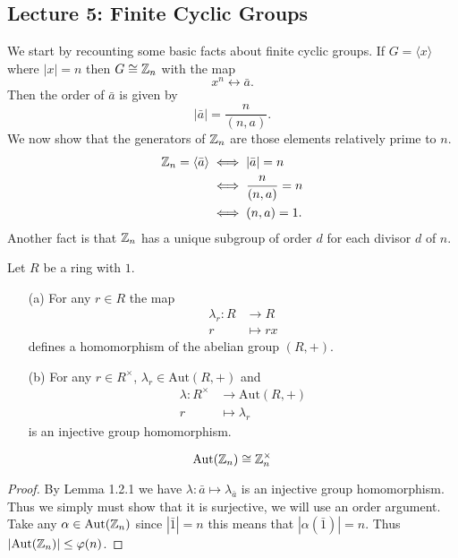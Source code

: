 \documentclass[11pt,leqno,oneside]{amsart}
\newcommand{\isom}{\mathrel{\cong}}
\newcommand{\Aut}{\text{Aut}}  %
\begin{document}
\subsection*{Lecture 5: Finite Cyclic Groups}
We start by recounting some basic facts about finite cyclic groups. If
\(G=\langle x\rangle\) where \(|x|=n\) then \(G \isom \Z_n\) with the map
\[x^n \longleftrightarrow \bar{a}.\] Then the order of \(\bar{a}\) is given by
\[|\bar{a}|=\frac{n}{(n,a)}.\] We now show that the generators of \({\mathbb Z}_n\) are
those elements relatively prime to \(n\).
\begin{align*}
  {\mathbb Z}_n = \langle \bar{a} \rangle &\iff |\bar{a}|=n\\
                                 &\iff \frac{n}{(n,a)}=n\\
                                 &\iff (n,a)=1.
\end{align*}
Another fact is that \({\mathbb Z}_n\) has a unique subgroup of order \(d\) for each
divisor \(d\) of \(n\).
\begin{lem*}[1.2.1] Let \(R\) be a ring with \(1\).
  \begin{enumerate}
  \item[(a)] For any \(r \in R\) the map
    \begin{align*}
      \lambda_r \colon R &\to R\\
      r &\mapsto rx
    \end{align*}
    defines a homomorphism of the abelian group \((R,+)\).
  \item[(b)] For any \(r \in R^\times\), \(\lambda_r \in \Aut(R,+)\) and
    \begin{align*}
      \lambda \colon R^\times &\to \Aut(R,+)\\
      r &\mapsto \lambda_r
    \end{align*}
    is an injective group homomorphism.
  \end{enumerate}

\end{lem*}
\begin{prop*}[1.2.2]
  \[\Aut(\Z_n) \isom \Z_n^\times\]
\end{prop*}
\begin{proof}
  By Lemma 1.2.1 we have \(\lambda \colon \bar{a} \mapsto \lambda_{\bar{a}}\) is
  an injective group homomorphism. Thus we simply must show that it is
  surjective, we will use an order argument. Take any \(\alpha \in \Aut(\Z_n)\)
  since \(|\bar{1}|=n\) this means that \(|\alpha(\bar{1})|=n\). Thus
  \(|\Aut(\Z_n)| \le \varphi(n)\).
\end{proof}
\end{document}
